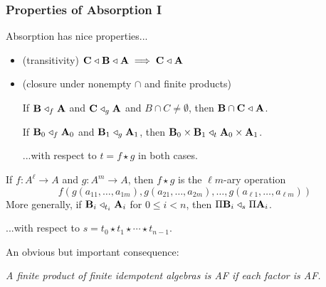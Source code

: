 \documentclass[xcolor=dvipsnames,9pt,hide notes,mathserif]{beamer}
\begin{document}
\begin{frame} \frametitle{Properties of Absorption I}
Absorption has nice properties...
  \begin{itemize}
  \item (transitivity) $\mathbf{C} \mathrel{\triangleleft} \mathbf{B} \mathrel{\triangleleft} \mathbf{A} \; \Longrightarrow \; \mathbf{C} \mathrel{\triangleleft} \mathbf{A}$
  \item (closure under nonempty $\cap$ and finite products)
    
    \medskip
    If $\mathbf{B} \mathrel{\triangleleft}_f \mathbf{A}$ and $\mathbf{C} \mathrel{\triangleleft}_g \mathbf{A}$ and $B \cap C\neq \emptyset$, then 
    $\mathbf{B} \cap \mathbf{C}\mathrel{\triangleleft} \mathbf{A}$.

    \medskip

    If $\mathbf{B}_0 \mathrel{\triangleleft}_f \mathbf{A}_0$ and $\mathbf{B}_1 \mathrel{\triangleleft}_g \mathbf{A}_1$,
    then $\mathbf{B}_0\times \mathbf{B}_1 \mathrel{\triangleleft}_t \mathbf{A}_0\times \mathbf{A}_1$. 

    \smallskip
    {\small ...with respect to $t = f\star g$ in both cases.}

    \medskip
    
  \end{itemize}

  \begin{overprint}
    
        If $f: A^\ell\to A$ and $g: A^m\to A$, then
        $f \star g$  is the $\ell m$-ary operation 
        \[f(g(a_{1 1}, \dots, a_{1 m}), g(a_{2 1}, \dots, a_{2 m}), \dots,  g(a_{\ell 1}, \dots, a_{\ell m}))\]
    More generally, 
    if $\mathbf{B}_i\mathrel{\triangleleft}_{t_i}\mathbf{A}_i$ for $0\leq i < n$, then
    $\Pi \mathbf{B}_i \mathrel{\triangleleft}_s \Pi \mathbf{A}_i$.
    

    \smallskip
    {\small ...with respect to $s= t_0\star t_1 \star \cdots \star t_{n-1}$.}

    \bigskip
    An obvious but important consequence:
    \begin{center}
    {\it A finite product of finite idempotent algebras is AF if each factor is AF.}
    \end{center}
  \end{overprint}
\end{frame}
\end{document}
